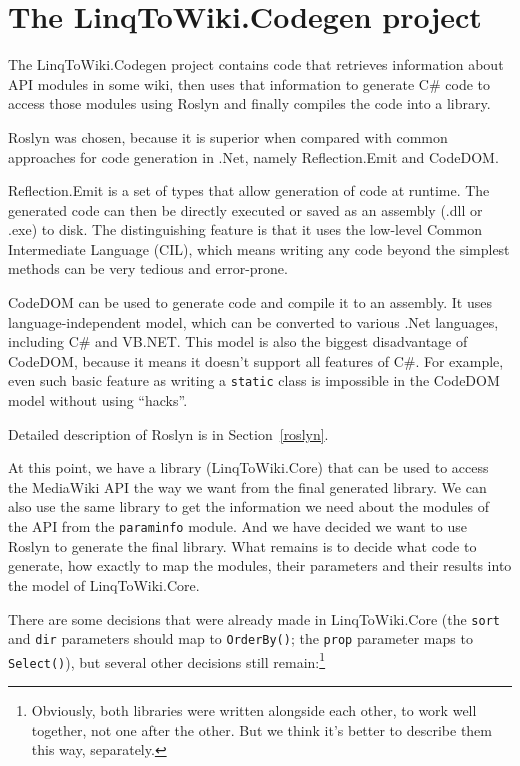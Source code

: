 \section{The LinqToWiki.Codegen project}
\label{ltwc}

The LinqToWiki.Codegen project contains code that retrieves information about API modules in some wiki,
then uses that information to generate C\# code to access those modules using Roslyn
and finally compiles the code into a library.

\medskip

Roslyn was chosen, because it is superior when compared with common approaches for code generation in .Net,
namely Reflection.Emit and CodeDOM.

Reflection.Emit \cite{reflection-emit} is a set of types that allow generation of code at runtime.
The generated code can then be directly executed or saved as an assembly (.dll or .exe) to disk.
The distinguishing feature is that it uses the low-level Common Intermediate Language (CIL),
which means writing any code beyond the simplest methods can be very tedious and error-prone.

CodeDOM \cite{codedom} can be used to generate code and compile it to an assembly.
It uses language-independent model, which can be converted to various .Net languages,
including C\# and VB.NET.
This model is also the biggest disadvantage of CodeDOM, because it means it doesn't support all features of C\#.
For example, even such basic feature as writing a \lstinline{static} class is impossible in the CodeDOM model
without using “hacks”.

Detailed description of Roslyn is in Section~\ref{roslyn}.

\medskip

At this point, we have a library (LinqToWiki.Core) that can be used to access the MediaWiki API the way we want
from the final generated library.
We can also use the same library to get the information we need about the modules of the API from the \texttt{paraminfo} module.
And we have decided we want to use Roslyn to generate the final library.
What remains is to decide what code to generate, how exactly to map the modules, their parameters
and their results into the model of LinqToWiki.Core.


There are some decisions that were already made in LinqToWiki.Core
(the \texttt{sort} and \texttt{dir} parameters should map to \lstinline{OrderBy()};
the \texttt{prop} parameter maps to \lstinline{Select()}),
but several other decisions still remain:\footnote{
Obviously, both libraries were written alongside each other, to work well together, not one after the other.
But we think it's better to describe them this way, separately.}

